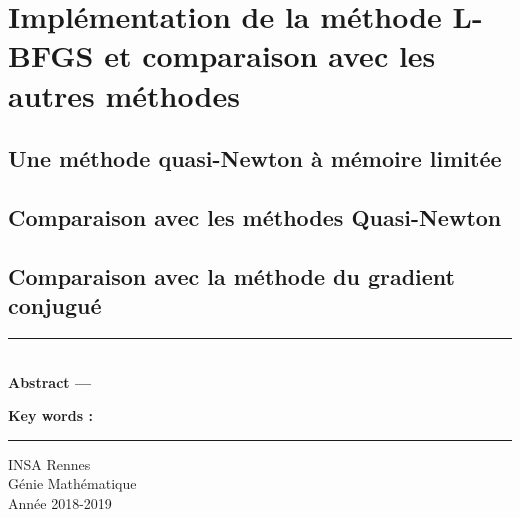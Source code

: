 \documentclass[10pt,a4paper]{article}
\theoremstyle{definition}
\theoremstyle{plain}
\theoremstyle{remark}
\begin{document}


\section{Implémentation de la méthode L-BFGS et comparaison avec les autres méthodes}

\subsection{Une méthode quasi-Newton à mémoire limitée}

\subsection{Comparaison avec les méthodes Quasi-Newton}

\subsection{Comparaison avec la méthode du gradient conjugué}

%


\clearpage



\nocite{*}

\clearpage


\thispagestyle{empty}

\vspace*{\fill}
\noindent\rule[2pt]{\textwidth}{0.5pt}\\
{\textbf{Abstract ---}}


{\textbf{Key words :}}


\noindent\rule[2pt]{\textwidth}{0.5pt}
\begin{center}
  INSA Rennes\\
  Génie Mathématique\\
  Année 2018-2019\\
\end{center}
\vspace*{\fill}
\end{document}
